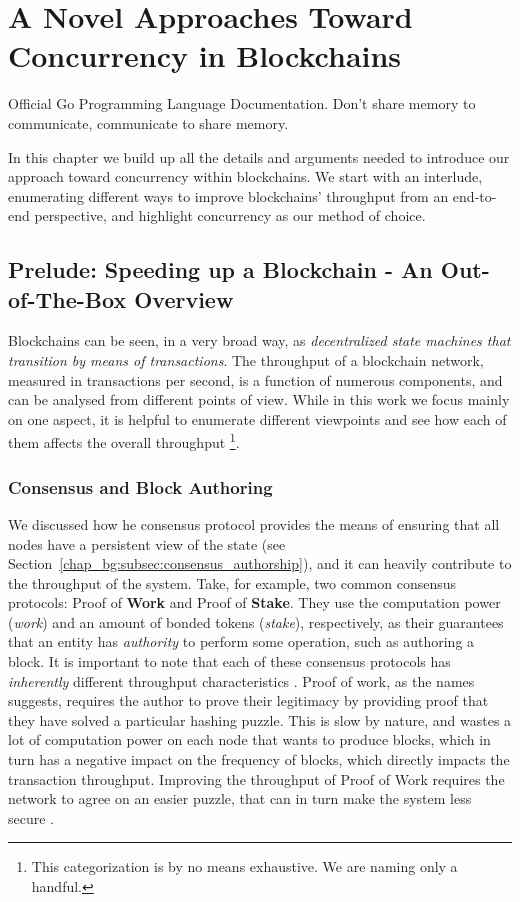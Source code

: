 \chapter{A Novel Approaches Toward Concurrency in Blockchains} \label{chap:approach}

\begin{chapquote}{Official Go Programming Language Documentation.}
	Don't share memory to communicate, communicate to share memory.
\end{chapquote}

In this chapter we build up all the details and arguments needed to introduce our approach toward
concurrency within blockchains. We start with an interlude, enumerating different ways to improve
blockchains' throughput from an end-to-end perspective, and highlight concurrency as our method of
choice.

\section{Prelude: Speeding up a Blockchain - An Out-of-The-Box
Overview}\label{chap_approach:sec:ways_to_speedup}

Blockchains can be seen, in a very broad way, as \textit{decentralized state machines that
transition by means of transactions}. The throughput of a blockchain network, measured in
transactions per second, is a function of numerous components, and can be analysed from different
points of view. While in this work we focus mainly on one aspect, it is helpful to enumerate
different viewpoints and see how each of them affects the overall throughput \footnote{This
categorization is by no means exhaustive. We are naming only a handful.}.

\subsection{Consensus and Block Authoring}
We discussed how he consensus protocol provides the means of ensuring that all nodes have a
persistent view of the state (see Section~\ref{chap_bg:subsec:consensus_authorship}), and it can
heavily contribute to the throughput of the system. Take, for example, two common consensus
protocols: Proof of \textbf{Work} and Proof of \textbf{Stake}. They use the computation power
(\textit{work}) and an amount of bonded tokens (\textit{stake}), respectively, as their guarantees
that an entity has \textit{authority} to perform some operation, such as authoring a block. It is
important to note that each of these consensus protocols has  \textit{inherently} different
throughput characteristics \cite{meneghettiSurveyEfficientParallelization2019}. Proof of work, as
the names suggests, requires the author to prove their legitimacy by providing proof that they have
solved a particular hashing puzzle. This is slow by nature, and wastes a lot of computation power on
each node that wants to produce blocks, which in turn has a negative impact on the frequency of
blocks, which directly impacts the transaction throughput. Improving the throughput of Proof of Work
requires the network to agree on an easier puzzle, that can in turn make the system less secure
\cite{gervaisSecurityPerformanceProof2016}.

